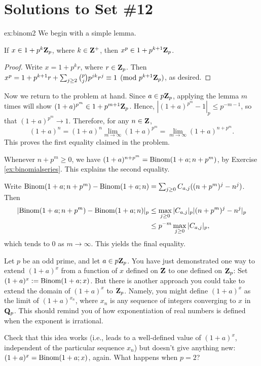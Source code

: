 \chapter*{Solutions to Set \#12}
\label{set11sols}



\begin{sol}{ex:binom2} We begin with a simple lemma.

\begin{lem} If $x \in 1+p^k \mathbf{Z}_p$, where $k \in \mathbf{Z}^{+}$, then $x^p \in 1+p^{k+1}\mathbf{Z}_p$.\end{lem}
\begin{proof} Write $x=1+p^k r$, where $r \in \mathbf{Z}_p$. Then $x^p = 1 + p^{k+1}r + \sum_{j \ge 2} \binom{p}{j} p^{jk} r^j \equiv 1 \pmod{p^{k+1}\mathbf{Z}_p}$, as desired.\end{proof}

Now we return to the problem at hand. Since $a\in p\mathbf{Z}_p$, applying the lemma $m$ times will show  $(1+a)^{p^m} \in 1 + p^{m+1}\mathbf{Z}_p$. Hence, $|(1+a)^{p^m}-1|_p \le p^{-m-1}$, so that $(1+a)^{p^m}\to 1$. Therefore, for any $n \in \mathbf{Z}$,
\[ (1+a)^{n} = (1+a)^{n} \lim_{m\to\infty} (1+a)^{p^m} = \lim_{m\to\infty} (1+a)^{n+p^m}. \]
This proves the first equality claimed in the problem.

Whenever $n+p^m\ge 0$, we have $(1+a)^{n+p^m} = \mathrm{Binom}(1+a;n+p^m)$, by Exercise \ref{ex:binomialseries}. This explains the second equality.

Write $\mathrm{Binom}(1+a;n +p^m)-\mathrm{Binom}(1+a;n) =\sum_{j\ge 0} C_{a,j} ((n+p^m)^j-n^j)$. Then
\begin{align*} |\mathrm{Binom}(1+a;n +p^m)-\mathrm{Binom}(1+a;n)|_p &\le \max_{j\ge 0} |C_{a,j}|_p |(n+p^m)^j-n^j|_p \\& \le p^{-m} \max_{j\ge 0} |C_{a,j}|_p, \end{align*}
which tends to $0$ as $m\to\infty$. This yields the final equality.
\end{sol}

\begin{challenge} Let $p$ be an odd prime, and let $a \in p\mathbf{Z}_p$. You have just demonstrated one way to extend $(1+a)^x$ from a function of $x$ defined on $\mathbf{Z}$ to one defined on $\mathbf{Z}_p$: Set $(1+a)^x := \mathrm{Binom}(1+a;x)$. But there is another approach you could take to extend the domain of $(1+a)^x$ to $\mathbf{Z}_p$. Namely, you might define $(1+a)^x$ as the limit of $(1+a)^{x_n}$, where $x_n$ is any sequence of integers converging to $x$ in $\mathbf{Q}_p$. This should remind you of how exponentiation of real numbers is defined when the exponent is irrational.

Check that this idea works (i.e., leads to a well-defined value of $(1+a)^x$, independent of the particular sequence $x_n$) but doesn't give anything new: $(1+a)^x = \mathrm{Binom}(1+a;x)$, again. What happens when $p=2$?
\end{challenge}

